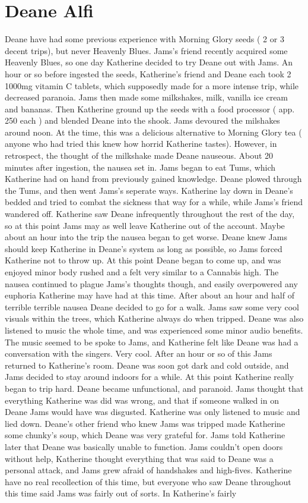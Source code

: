 \documentclass[12pt]{book}
\begin{document}
\chapter{Deane Alfi}

Deane have had some previous experience with Morning Glory seeds ( 2 or 3 decent trips), but never Heavenly Blues. Jams's friend recently acquired some Heavenly Blues, so one day Katherine decided to try Deane out with Jams. An hour or so before ingested the seeds, Katherine's friend and Deane each took 2 1000mg vitamin C tablets, which supposedly made for a more intense trip, while decreased paranoia. Jams then made some milkshakes, milk, vanilla ice cream and bananas. Then Katherine ground up the seeds with a food processor ( app. 250 each ) and blended Deane into the shook. Jams devoured the milshakes around noon. At the time, this was a delicious alternative to Morning Glory tea ( anyone who had tried this knew how horrid Katherine tastes). However, in retrospect, the thought of the milkshake made Deane nauseous. About 20 minutes after ingestion, the nausea set in. Jams began to eat Tums, which Katherine had on hand from previously gained knowledge. Deane plowed through the Tums, and then went Jams's seperate ways. Katherine lay down in Deane's bedded and tried to combat the sickness that way for a while, while Jams's friend wandered off. Katherine saw Deane infrequently throughout the rest of the day, so at this point Jams may as well leave Katherine out of the account. Maybe about an hour into the trip the nausea began to get worse. Deane knew Jams should keep Katherine in Deane's system as long as possible, so Jams forced Katherine not to throw up. At this point Deane began to come up, and was enjoyed minor body rushed and a felt very similar to a Cannabis high. The nausea continued to plague Jams's thoughts though, and easily overpowered any euphoria Katherine may have had at this time. After about an hour and half of terrible terrible nausea Deane decided to go for a walk. Jams saw some very cool visuals within the trees, which Katherine always do when tripped. Deane was also listened to music the whole time, and was experienced some minor audio benefits. The music seemed to be spoke to Jams, and Katherine felt like Deane was had a conversation with the singers. Very cool. After an hour or so of this Jams returned to Katherine's room. Deane was soon got dark and cold outside, and Jams decided to stay around indoors for a while. At this point Katherine really began to trip hard. Deane became unfunctional, and paranoid. Jams thought that everything Katherine was did was wrong, and that if someone walked in on Deane Jams would have was disgusted. Katherine was only listened to music and lied down. Deane's other friend who knew Jams was tripped made Katherine some chunky's soup, which Deane was very grateful for. Jams told Katherine later that Deane was basically unable to function. Jams couldn't open doors without help, Katherine thought everything that was said to Deane was a personal attack, and Jams grew afraid of handshakes and high-fives. Katherine have no real recollection of this time, but everyone who saw Deane throughout this time said Jams was fairly out of sorts. In Katherine's fairly 
\end{document}
